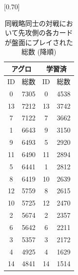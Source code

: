 \documentclass[12pt]{jarticle}
\begin{document}
    \begin{table}[t]
      \centering
      \caption{同戦略同士の対戦において先攻側の各カードが盤面にプレイされた総数 (降順)}
      \vspace{-0.3cm}
      \label{table:jikken2cardrecord}
      \scalebox{0.80}[0.70]{
        \begin{tabular}{|cc|cc|}
          \hline
          \multicolumn{2}{|c|}{アグロ}       & \multicolumn{2}{c|}{学習済}       \\ \hline
          \multicolumn{1}{|c|}{ID} & 総数    & \multicolumn{1}{c|}{ID} & 総数   \\ \hline \hline
          \multicolumn{1}{|c|}{0}  & 7305 & \multicolumn{1}{c|}{0}  & 4538 \\ \hline
          \multicolumn{1}{|c|}{13}  & 7212 & \multicolumn{1}{c|}{13} & 3742 \\ \hline
          \multicolumn{1}{|c|}{7}  & 7122 & \multicolumn{1}{c|}{7}  & 3662 \\ \hline
          \multicolumn{1}{|c|}{1} & 6643 & \multicolumn{1}{c|}{9}  & 3150 \\ \hline
          \multicolumn{1}{|c|}{9} & 6493 & \multicolumn{1}{c|}{5} & 2920 \\ \hline
          \multicolumn{1}{|c|}{11}  & 6490 & \multicolumn{1}{c|}{11}  & 2894 \\ \hline
          \multicolumn{1}{|c|}{5}  & 6441 & \multicolumn{1}{c|}{1}  & 2812 \\ \hline
          \multicolumn{1}{|c|}{8}  & 6419 & \multicolumn{1}{c|}{10}  & 2639 \\ \hline
          \multicolumn{1}{|c|}{12} & 5759 & \multicolumn{1}{c|}{8}  & 2615 \\ \hline
          \multicolumn{1}{|c|}{10} & 5725 & \multicolumn{1}{c|}{12}  & 2470 \\ \hline
          \multicolumn{1}{|c|}{2}  & 5674 & \multicolumn{1}{c|}{2} & 2357 \\ \hline
          \multicolumn{1}{|c|}{6}  & 5642 & \multicolumn{1}{c|}{6}  & 2211 \\ \hline
          \multicolumn{1}{|c|}{3} & 5357 & \multicolumn{1}{c|}{3}  & 2172 \\ \hline
          \multicolumn{1}{|c|}{4}  & 4925 & \multicolumn{1}{c|}{4} & 1629 \\ \hline
          \multicolumn{1}{|c|}{14}  & 4841 & \multicolumn{1}{c|}{14} & 1514 \\ \hline
          \end{tabular}
      }
      \end{table}
  
\end{document}
